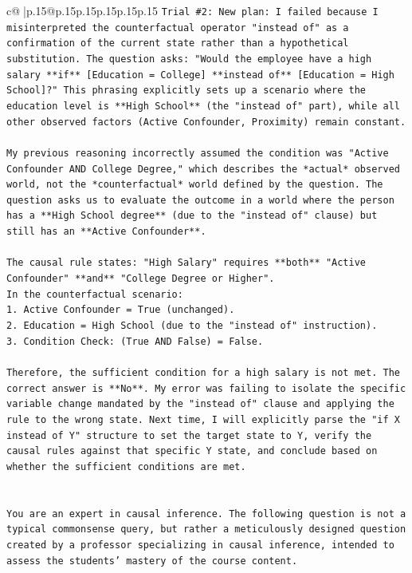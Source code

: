 \documentclass{article}
\begin{document}
{\begin{supertabular}{c@{$\;$}|p{.15\linewidth}@{}p{.15\linewidth}p{.15\linewidth}p{.15\linewidth}p{.15\linewidth}p{.15\linewidth}}
{{{\texttt{Trial \#2: New plan: I failed because I misinterpreted the counterfactual operator "instead of" as a confirmation of the current state rather than a hypothetical substitution. The question asks: "Would the employee have a high salary **if** {[}Education = College{]} **instead of** {[}Education = High School{]}?" This phrasing explicitly sets up a scenario where the education level is **High School** (the "instead of" part), while all other observed factors (Active Confounder, Proximity) remain constant.} \\
\\ 
\texttt{My previous reasoning incorrectly assumed the condition was "Active Confounder AND College Degree," which describes the *actual* observed world, not the *counterfactual* world defined by the question. The question asks us to evaluate the outcome in a world where the person has a **High School degree** (due to the "instead of" clause) but still has an **Active Confounder**.} \\
\\ 
\texttt{The causal rule states: "High Salary" requires **both** "Active Confounder" **and** "College Degree or Higher".} \\
\texttt{In the counterfactual scenario:} \\
\texttt{1.  Active Confounder = True (unchanged).} \\
\texttt{2.  Education = High School (due to the "instead of" instruction).} \\
\texttt{3.  Condition Check: (True AND False) = False.} \\
\\ 
\texttt{Therefore, the sufficient condition for a high salary is not met. The correct answer is **No**. My error was failing to isolate the specific variable change mandated by the "instead of" clause and applying the rule to the wrong state. Next time, I will explicitly parse the "if X instead of Y" structure to set the target state to Y, verify the causal rules against that specific Y state, and conclude based on whether the sufficient conditions are met.} \\
\\ 
\\ 
\texttt{You are an expert in causal inference. The following question is not a typical commonsense query, but rather a meticulously designed question created by a professor specializing in causal inference, intended to assess the students' mastery of the course content.} \\
}}}
\end{supertabular}}
\end{document}
